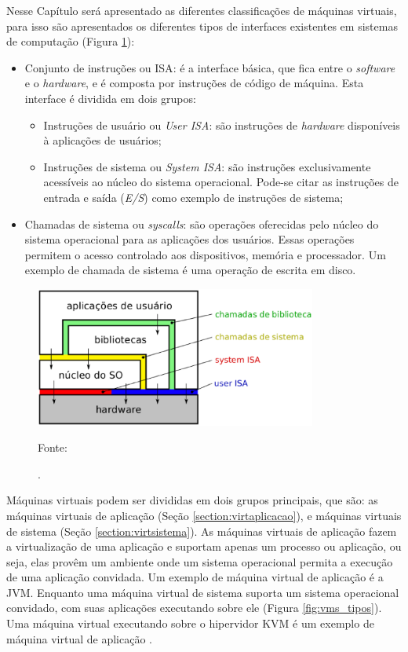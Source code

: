 Nesse Capítulo será apresentado as diferentes classificações de máquinas virtuais, para isso são apresentados os diferentes 
tipos de interfaces existentes em sistemas de computação (Figura \ref{fig:interfaces_isa}):
\begin{itemize}
 \item Conjunto de instruções ou \ac{ISA}: é a interface básica, que fica entre o \textit{software} e o \textit{hardware}, e é composta por 
 instruções de código de máquina. Esta interface é dividida em dois grupos:
 \begin{itemize}
  \item Instruções de usuário ou \textit{User \ac{ISA}}: são instruções de \textit{hardware} disponíveis à aplicações de usuários;
  \item Instruções de sistema ou \textit{System \ac{ISA}}: são instruções exclusivamente acessíveis ao núcleo do sistema operacional. 
  Pode-se citar as instruções de entrada e saída (\textit{E/S}) como exemplo de instruções de sistema;
 \end{itemize}
 \item Chamadas de sistema ou \textit{syscalls}: são operações oferecidas pelo núcleo do sistema operacional para as aplicações dos usuários.
 Essas operações permitem o acesso controlado aos dispositivos, memória e processador. Um exemplo de chamada de sistema é uma operação de escrita 
 em disco.
\end{itemize}

\begin{figure}[interfaces_isa]
 \centering
 \includegraphics[width=350px]{img/interfaces_isa.eps}
 \caption{.}
 \label{fig:interfaces_isa}
 Fonte: \citet{maziero2013}
\end{figure}

Máquinas virtuais podem ser divididas em dois grupos principais, que são: as máquinas virtuais de aplicação (Seção \ref{section:virtaplicacao}), 
e máquinas virtuais de sistema (Seção \ref{section:virtsistema}). As máquinas virtuais de aplicação fazem a virtualização de uma 
aplicação e suportam apenas um processo ou aplicação, ou seja, elas provêm um ambiente onde um sistema operacional permita a execução de
uma aplicação convidada. Um exemplo de máquina virtual de aplicação é a \ac{JVM}. Enquanto uma máquina virtual de sistema suporta um sistema
operacional convidado, com suas aplicações executando sobre ele (Figura \ref{fig:vms_tipos}). Uma máquina virtual executando sobre o 
hipervidor \ac{KVM} é um exemplo de máquina virtual de aplicação \cite{laureano2008}.

